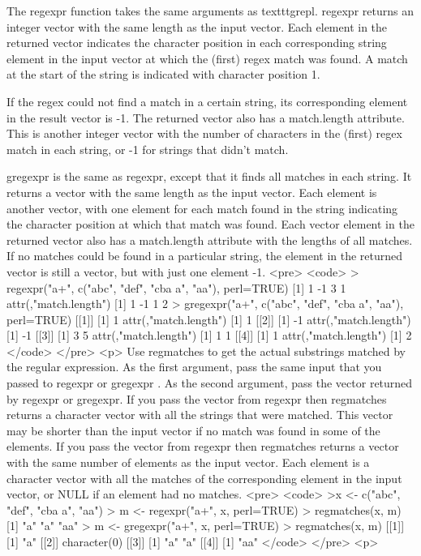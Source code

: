 
The regexpr function takes the same arguments as texttt{grepl}. regexpr returns an integer vector with the same length as the input vector. Each element in the returned vector indicates the character position in each corresponding string element in the input vector at which the (first) regex match was found. A match at the start of the string is indicated with character position 1.

If the regex could not find a match in a certain string, its corresponding element in the result vector is -1. The returned vector also has a match.length attribute. This is another integer vector with the number of characters in the (first) regex match in each string, or -1 for strings that didn't match.

gregexpr is the same as regexpr, except that it finds all matches in each string. It returns a vector with the same length as the input vector. Each element is another vector, with one element for each match found in the string indicating the character position at which that match was found. Each vector element in the returned vector also has a match.length attribute with the lengths of all matches. If no matches could be found in a particular string, the element in the returned vector is still a vector, but with just one element -1.
<pre>
<code>
> regexpr("a+", c("abc", "def", "cba a", "aa"), perl=TRUE)
[1]  1 -1  3  1
attr(,"match.length")
[1]  1 -1  1  2
> gregexpr("a+", c("abc", "def", "cba a", "aa"), perl=TRUE)
[[1]]  [1] 1    attr(,"match.length")  [1] 1
[[2]]  [1] -1   attr(,"match.length")  [1] -1
[[3]]  [1] 3 5  attr(,"match.length")  [1] 1 1
[[4]]  [1] 1    attr(,"match.length")  [1] 2
</code>
</pre>
<p>
Use regmatches to get the actual substrings matched by the regular expression. As the first argument, pass the same input that you passed to regexpr or gregexpr . As the second argument, pass the vector returned by regexpr or gregexpr. If you pass the vector from regexpr then regmatches returns a character vector with all the strings that were matched. This vector may be shorter than the input vector if no match was found in some of the elements. If you pass the vector from regexpr then regmatches returns a vector with the same number of elements as the input vector. Each element is a character vector with all the matches of the corresponding element in the input vector, or NULL if an element had no matches.
<pre>
<code>
>x <- c("abc", "def", "cba a", "aa")
> m <- regexpr("a+", x, perl=TRUE)
> regmatches(x, m)
[1]  "a"  "a"  "aa"
> m <- gregexpr("a+", x, perl=TRUE)
> regmatches(x, m)
[[1]]  [1] "a"
[[2]]  character(0)
[[3]]  [1] "a"   "a"
[[4]]  [1] "aa"
</code>
</pre>
<p>

